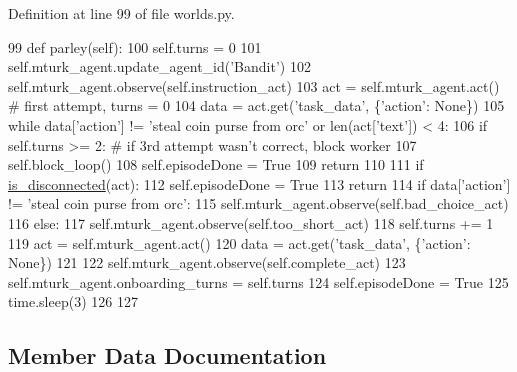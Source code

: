 Definition at line 99 of file worlds.\+py.


\begin{DoxyCode}
99     \textcolor{keyword}{def }parley(self):
100         self.turns = 0
101         self.mturk\_agent.update\_agent\_id(\textcolor{stringliteral}{'Bandit'})
102         self.mturk\_agent.observe(self.instruction\_act)
103         act = self.mturk\_agent.act()  \textcolor{comment}{# first attempt, turns = 0}
104         data = act.get(\textcolor{stringliteral}{'task\_data'}, \{\textcolor{stringliteral}{'action'}: \textcolor{keywordtype}{None}\})
105         \textcolor{keywordflow}{while} data[\textcolor{stringliteral}{'action'}] != \textcolor{stringliteral}{'steal coin purse from orc'} \textcolor{keywordflow}{or} len(act[\textcolor{stringliteral}{'text'}]) < 4:
106             \textcolor{keywordflow}{if} self.turns >= 2:  \textcolor{comment}{# if 3rd attempt wasn't correct, block worker}
107                 self.block\_loop()
108                 self.episodeDone = \textcolor{keyword}{True}
109                 \textcolor{keywordflow}{return}
110 
111             \textcolor{keywordflow}{if} \hyperlink{namespacelight__chats_1_1worlds_a43b0aff73307cda95a089763b77f40d3}{is\_disconnected}(act):
112                 self.episodeDone = \textcolor{keyword}{True}
113                 \textcolor{keywordflow}{return}
114             \textcolor{keywordflow}{if} data[\textcolor{stringliteral}{'action'}] != \textcolor{stringliteral}{'steal coin purse from orc'}:
115                 self.mturk\_agent.observe(self.bad\_choice\_act)
116             \textcolor{keywordflow}{else}:
117                 self.mturk\_agent.observe(self.too\_short\_act)
118             self.turns += 1
119             act = self.mturk\_agent.act()
120             data = act.get(\textcolor{stringliteral}{'task\_data'}, \{\textcolor{stringliteral}{'action'}: \textcolor{keywordtype}{None}\})
121 
122         self.mturk\_agent.observe(self.complete\_act)
123         self.mturk\_agent.onboarding\_turns = self.turns
124         self.episodeDone = \textcolor{keyword}{True}
125         time.sleep(3)
126 
127 
\end{DoxyCode}


\subsection{Member Data Documentation}
\mbox{\label{classlight__chats_1_1worlds_1_1LightChatOnboardingWorld_a49379d531932e29b9c46e39f58ba4b3f}} 
